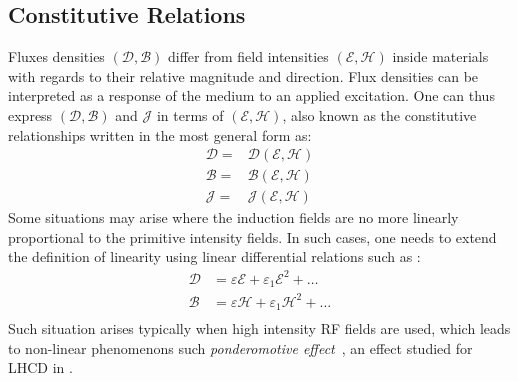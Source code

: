 \subsection{Constitutive Relations}
Fluxes densities $(\boldsymbol{\mathcal{D}}, \boldsymbol{\mathcal{B}})$ differ from field intensities $(\boldsymbol{\mathcal{E}}, \boldsymbol{\mathcal{H}})$ inside materials with regards to their relative magnitude and direction. Flux densities can be interpreted  as a response of the medium to an applied excitation. One can thus express $(\boldsymbol{\mathcal{D}},\boldsymbol{\mathcal{B}})$ and $\boldsymbol{\mathcal{J}}$ in terms of $(\boldsymbol{\mathcal{E}},\boldsymbol{\mathcal{H}})$, also known as the constitutive relationships written in the most general form as:
\begin{subequations}
	\begin{align}
		\boldsymbol{\mathcal{D}} =& \boldsymbol{\mathcal{D}}(\boldsymbol{\mathcal{E}},\boldsymbol{\mathcal{H}}) \\
		\boldsymbol{\mathcal{B}} =& \boldsymbol{\mathcal{B}}(\boldsymbol{\mathcal{E}},\boldsymbol{\mathcal{H}}) \\
		\boldsymbol{\mathcal{J}} =& \boldsymbol{\mathcal{J}}(\boldsymbol{\mathcal{E}},\boldsymbol{\mathcal{H}})
	\end{align}
\end{subequations}
Some situations may arise where the induction fields are no more linearly proportional to the primitive intensity fields. In such cases, one needs to extend the definition of linearity using linear differential relations such as :
\begin{subequations}
	\begin{align}
		\boldsymbol{\mathcal{D}} &= \varepsilon \boldsymbol{\mathcal{E}} + \varepsilon_1 \boldsymbol{\mathcal{E}}^2  + \ldots \\
		\boldsymbol{\mathcal{B}} &= \varepsilon \boldsymbol{\mathcal{H}} + \varepsilon_1 \boldsymbol{\mathcal{H}}^2 + \ldots \\
	\end{align}
\end{subequations}%
Such situation arises typically when high intensity RF fields are used, which leads to non-linear phenomenons such \emph{ponderomotive effect}~, an effect studied for LHCD in .



